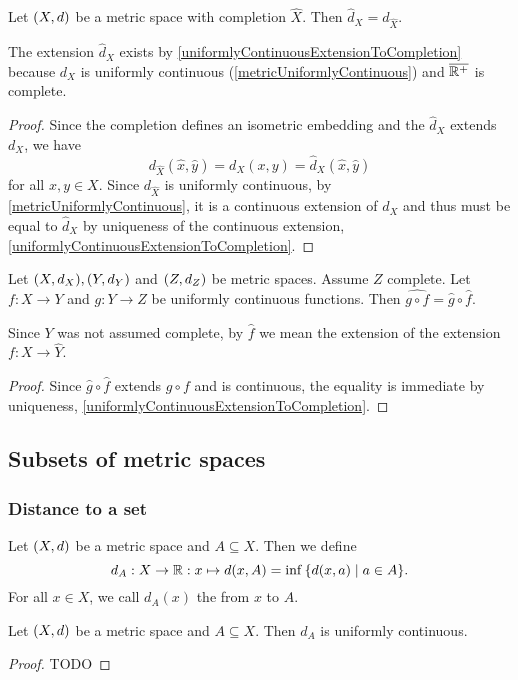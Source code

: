 \begin{lemma}
Let $\sSet{X,d}$ be a metric space with completion $\hat{X}$. Then $\hat{d}_X = d_{\hat{X}}$.
\end{lemma}
The extension $\hat{d}_X$ exists by \ref{uniformlyContinuousExtensionToCompletion} because $d_X$ is uniformly continuous (\ref{metricUniformlyContinuous}) and $\overline{\mathbb{R}^+}$ is complete.
\begin{proof}
Since the completion defines an isometric embedding and the $\hat{d}_X$ extends $d_X$, we have
\[ d_{\hat{X}}(\hat{x}, \hat{y}) = d_X(x,y) = \hat{d}_X(\hat{x}, \hat{y}) \]
for all $x,y\in X$. Since $d_{\hat{X}}$ is uniformly continuous, by \ref{metricUniformlyContinuous}, it is a continuous extension of $d_X$ and thus must be equal to $\hat{d}_X$ by uniqueness of the continuous extension, \ref{uniformlyContinuousExtensionToCompletion}.  
\end{proof}
\begin{lemma}
Let $\sSet{X,d_X}, \sSet{Y,d_Y}$ and $\sSet{Z,d_Z}$ be metric spaces. Assume $Z$ complete. Let $f: X\to Y$ and $g: Y\to Z$ be uniformly continuous functions. Then $\widehat{g\circ f} = \hat{g}\circ \hat{f}$.
\end{lemma}
Since $Y$ was not assumed complete, by $\hat{f}$ we mean the extension of the extension $f: X\to \hat{Y}$. 
\begin{proof}
Since $\hat{g}\circ \hat{f}$ extends $g\circ f$ and is continuous, the equality is immediate by uniqueness, \ref{uniformlyContinuousExtensionToCompletion}.
\end{proof}


\subsection{Subsets of metric spaces}
\subsubsection{Distance to a set}
\begin{definition}
Let $\sSet{X,d}$ be a metric space and $A\subseteq X$. Then we define
\[ d_A: X\to \R: x\mapsto d(x,A) = \inf\setbuilder{d(x,a)}{a\in A}. \]
For all $x\in X$, we call $d_A(x)$ the  from $x$ to $A$.
\end{definition}

\begin{lemma} \label{distanceToSetContinuous}
Let $\sSet{X,d}$ be a metric space and $A\subseteq X$. Then $d_A$ is uniformly continuous.
\end{lemma}
\begin{proof}
TODO
\end{proof}

